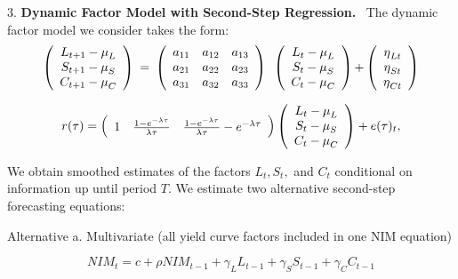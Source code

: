 \documentclass[12pt]{article}
\begin{document}
3. \textbf{Dynamic Factor Model with Second-Step Regression.} \ The dynamic
factor model we consider takes the form:
\bigskip
\begin{equation*}
\left(
\begin{array}{c}
{L_{t+1}-\mu _{L}} \\
{S_{t+1}-\mu _{S}} \\
{C_{t+1}-\mu _{C}}%
\end{array}%
\right) {\normalsize \ =\ }\left(
\begin{array}{ccc}
a_{11} & a_{12} & a_{13} \\
a_{21} & a_{22} & a_{23} \\
a_{31} & a_{32} & a_{33}%
\end{array}%
\right) {\normalsize \ }\left(
\begin{array}{c}
{L_{t}-\mu _{L}} \\
{S_{t}-\mu _{S}} \\
{C_{t}-\mu _{C}}%
\end{array}%
\right) {\normalsize +}\left(
\begin{array}{c}
{\eta _{Lt}} \\
{\eta _{St}} \\
{\eta _{Ct}}%
\end{array}%
\right)
\end{equation*}

\begin{equation*}
r(\tau )=\left(
\begin{array}{ccc}
1 & \frac{1-e^{-\lambda \tau }}{\lambda \tau } & \frac{1-e^{-\lambda \tau }}{%
\lambda \tau }-e^{-\lambda \tau }%
\end{array}%
\right) \left(
\begin{array}{c}
{L_{t}-\mu _{L}} \\
{S_{t}-\mu _{S}} \\
{C_{t}-\mu _{C}} 
\end{array}%
\right) +e(\tau )_{t},
\end{equation*}

We obtain smoothed estimates of the factors $L_{t},S_{t},$ and $C_{t}$
conditional on information up until period $T.$ We estimate two alternative
second-step forecasting equations:

\bigskip Alternative a. {\normalsize Multivariate (all yield curve factors
included in one NIM equation) }

\begin{equation*}
NIM_{t}=c+\rho NIM_{t-1}+\gamma _{L}L_{t-1}+\gamma _{S}S_{t-1}+\gamma
_{C}C_{t-1}
\end{equation*}
\end{document}
